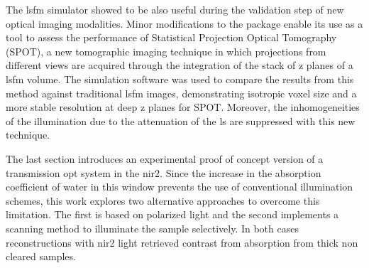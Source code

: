 The \gls{lsfm} simulator showed to be also useful during the validation step of new optical imaging modalities. Minor modifications to the package enable its use as a tool to assess the performance of Statistical Projection Optical Tomography (SPOT), a new tomographic imaging technique in which projections from different views are acquired through the integration of the stack of z planes of a \gls{lsfm} volume. The simulation software was used to compare the results from this method against traditional \gls{lsfm} images, demonstrating isotropic voxel size and a more stable resolution at deep z planes for SPOT. Moreover, the inhomogeneities of the illumination due to the attenuation of the \gls{ls} are suppressed with this new technique. 

The last section introduces an experimental proof of concept version of a transmission \gls{opt} system in the \gls{nir2}. Since the increase in the absorption coefficient of water in this window prevents the use of conventional illumination schemes, this work explores two alternative approaches to overcome this limitation. The first is based on polarized light and the second implements a scanning method to illuminate the sample selectively. In both cases reconstructions with \gls{nir2} light retrieved contrast from absorption from thick non cleared samples.
